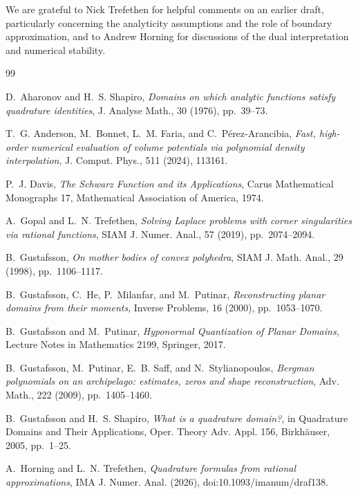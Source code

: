 \documentclass[onefignum,onetabnum]{siamart220329}
\begin{document}
We are grateful to Nick Trefethen for helpful comments on an earlier
draft, particularly concerning the analyticity assumptions and the role of
boundary approximation, and to Andrew Horning for discussions of the
dual interpretation and numerical stability.


\begin{thebibliography}{99}
\itemsep=1pt

D.~Aharonov and H.~S. Shapiro,
\emph{Domains on which analytic functions satisfy quadrature
identities}, J. Analyse Math., 30 (1976), pp.~39--73.

T.~G. Anderson, M.~Bonnet, L.~M. Faria, and C.~P\'erez-Arancibia,
\emph{Fast, high-order numerical evaluation of volume potentials via
polynomial density interpolation}, J. Comput. Phys., 511 (2024),
113161.

P.~J. Davis,
\emph{The Schwarz Function and its Applications}, Carus Mathematical
Monographs 17, Mathematical Association of America, 1974.

A.~Gopal and L.~N. Trefethen,
\emph{Solving Laplace problems with corner singularities via rational
functions}, SIAM J. Numer. Anal., 57 (2019), pp.~2074--2094.

B.~Gustafsson,
\emph{On mother bodies of convex polyhedra}, SIAM J. Math. Anal., 29
(1998), pp.~1106--1117.

B.~Gustafsson, C.~He, P.~Milanfar, and M.~Putinar,
\emph{Reconstructing planar domains from their moments},
Inverse Problems, 16 (2000), pp.~1053--1070.

B.~Gustafsson and M.~Putinar,
\emph{Hyponormal Quantization of Planar Domains}, Lecture Notes in
Mathematics 2199, Springer, 2017.

B.~Gustafsson, M.~Putinar, E.~B. Saff, and N.~Stylianopoulos,
\emph{Bergman polynomials on an archipelago: estimates, zeros and
shape reconstruction}, Adv. Math., 222 (2009), pp.~1405--1460.

B.~Gustafsson and H.~S. Shapiro,
\emph{What is a quadrature domain?}, in Quadrature Domains and Their
Applications, Oper. Theory Adv. Appl. 156, Birkh\"auser, 2005,
pp.~1--25.

A.~Horning and L.~N. Trefethen,
\emph{Quadrature formulas from rational approximations},
IMA J. Numer. Anal. (2026), doi:10.1093/imanum/draf138.


\end{thebibliography}
\end{document}
